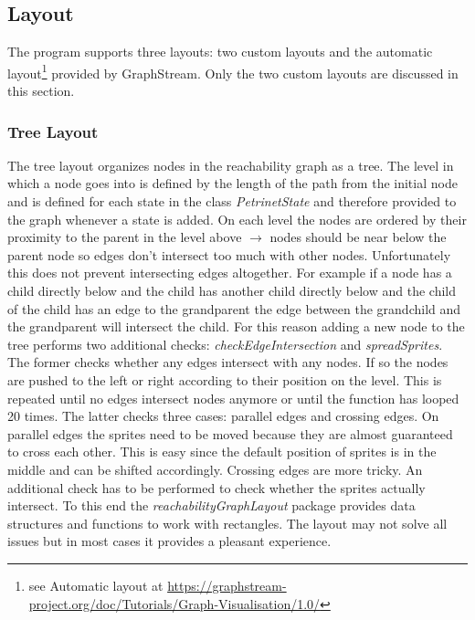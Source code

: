 \documentclass[10pt, a4paper]{article}
\begin{document}
\subsection{Layout}
\label{label:layout}

The program supports three layouts: two custom layouts and the automatic layout\footnote{see Automatic layout at \url{https://graphstream-project.org/doc/Tutorials/Graph-Visualisation/1.0/}} provided by GraphStream. Only the two custom layouts are discussed in this section.

\subsubsection{Tree Layout}
\label{label:treeLayout}

The tree layout organizes nodes in the reachability graph as a tree. The level in which a node goes into is defined by the length of the path from the initial node and is defined for each state in the class \textit{PetrinetState} and therefore provided to the graph whenever a state is added. On each level the nodes are ordered by their proximity to the parent in the level above $\rightarrow$ nodes should be near below the parent node so edges don't intersect too much with other nodes. Unfortunately this does not prevent intersecting edges altogether. For example if a node has a child directly below and the child has another child directly below and the child of the child has an edge to the grandparent the edge between the grandchild and the grandparent will intersect the child. For this reason adding a new node to the tree performs two additional checks: \textit{checkEdgeIntersection} and \textit{spreadSprites}. The former checks whether any edges intersect with any nodes. If so the nodes are pushed to the left or right according to their position on the level. This is repeated until no edges intersect nodes anymore or until the function has looped 20 times. The latter checks three cases: parallel edges and crossing edges. On parallel edges the sprites need to be moved because they are almost guaranteed to cross each other. This is easy since the default position of sprites is in the middle and can be shifted accordingly. Crossing edges are more tricky. An additional check has to be performed to check whether the sprites actually intersect. To this end the \textit{reachabilityGraphLayout} package provides data structures and functions to work with rectangles. The layout may not solve all issues but in most cases it provides a pleasant experience.
\end{document}
